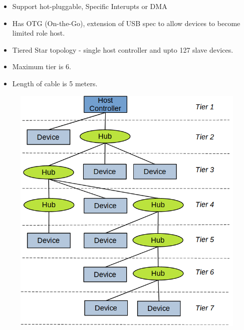 \documentclass{article}
\begin{document}
\begin{itemize}
    \item Support hot-pluggable, Specific Interupts or DMA
    \item Has OTG (On-the-Go), extension of USB spec to allow devices to become limited role host.
    \item Tiered Star topology - single host controller and upto 127 slave devices.
    \item Maximum tier is 6.
    \item Length of cable is 5 meters.
\end{itemize}

\begin{figure}[H]
    \begin{center}
        \includegraphics[scale=0.5]{DocuResources/usb_physical_topology.png}
    \end{center}
\end{figure}
\end{document}
